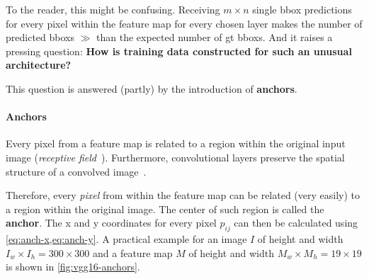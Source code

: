 To the reader, this might be confusing. Receiving \(m\times n\)
single \gls{bbox} predictions for every pixel within the \gls{feature map} for
every chosen layer makes the number of predicted \glspl{bbox} \(\gg\) than the
expected number of \gls{gt} \glspl{bbox}. And it raises a pressing question:\linebreak
\textbf{How is training data constructed for such an unusual architecture?}

This question is answered (partly) by the introduction of \textbf{anchors}.

\paragraph{Anchors}\label{par:anchors}
Every pixel from a \gls{feature map} is related to a region within the original
input image (\emph{receptive field}~\cite[cf.][331\psq]{Goodfellow.2016}).
Furthermore, \glspl{convolutional layer} preserve the spatial structure of a
convolved image~\cite[cf.][335\psqq]{Goodfellow.2016}.

Therefore, every \emph{pixel} from within the feature map can be related
(very easily) to a region within the original image. The center of such region
is called the \textbf{anchor}. The x and y coordinates for every pixel \(p_{ij}\)
can then be calculated using \cref{eq:anch-x,eq:anch-y}. A practical example for an
image \(I\) of height and width \(I_w\times I_h=300\times 300\) and a
\gls{feature map} \(M\) of height and width \(M_w\times M_h=19\times 19\)
is shown in \cref{fig:vgg16-anchors}.

